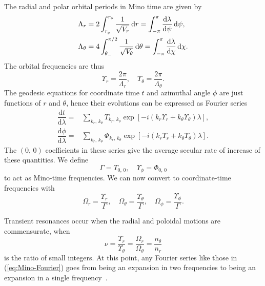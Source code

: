 \documentclass[aps,prd,amsfonts,amssymb,amsmath,nofootinbib,reprint,showpacs,superscriptaddress,twocolumn]{revtex4}
\newcommand{\eqnref}[1]{(\ref{eq:#1})}
\newcommand{\sub}[1]{\ensuremath{_\text{#1}}}
\newcommand{\dd}{\ensuremath{\mathrm{d}}}
\newcommand{\diff}[2]{\ensuremath{\dfrac{\dd {#1}}{\dd {#2}}}}
\newcommand{\intd}[4]{\ensuremath{\int_{#1}^{#2}{#3}\,\dd{#4}}}
\begin{document}
The radial and polar orbital periods in Mino time are given by
\begin{subequations}
\begin{align}
\Lambda_r = {} & 2\intd{r\sub{p}}{r\sub{a}}{\recip{\sqrt{V_r}}}{r} = \intd{-\pi}{\pi}{\diff{\lambda}{\psi}}{\psi}, \\
\Lambda_\theta = {} & 4\intd{\theta_-}{\pi/2}{\recip{\sqrt{V_\theta}}}{\theta} = \intd{-\pi}{\pi}{\diff{\lambda}{\chi}}{\chi}.
\end{align}
\end{subequations}
The orbital frequencies are thus
\begin{equation}
\Upsilon_r = \frac{2\pi}{\Lambda_r}, \quad \Upsilon_\theta = \frac{2\pi}{\Lambda_\theta}.
\end{equation}
The geodesic equations for coordinate time $t$ and azimuthal angle $\phi$ are just functions of $r$ and $\theta$, hence their evolutions can be expressed as Fourier series~\cite{Drasco2004}
\begin{subequations}
\begin{align}
\diff{t}{\lambda} = {} & \sum_{k_r,\,k_\theta}T_{k_r,\, k_\theta}\exp\left[-i\left(k_r\Upsilon_r + k_\theta\Upsilon_\theta\right)\lambda\right], \\
\diff{\phi}{\lambda} = {} & \sum_{k_r,\,k_\theta}\Phi_{k_r,\, k_\theta}\exp\left[-i\left(k_r\Upsilon_r + k_\theta\Upsilon_\theta\right)\lambda\right].
\label{eq:Mino-Fourier}
\end{align}
\end{subequations}
The $(0,\,0)$ coefficients in these series give the average secular rate of increase of these quantities. We define
\begin{equation}
\Gamma = T_{0,\,0}, \quad \Upsilon_\phi = \Phi_{0,\,0}
\end{equation}
to act as Mino-time frequencies. We can now convert to coordinate-time frequencies with
\begin{equation}
\Omega_r = \frac{\Upsilon_r}{\Gamma}, \quad \Omega_\theta = \frac{\Upsilon_\theta}{\Gamma}, \quad \Omega_\phi = \frac{\Upsilon_\phi}{\Gamma}.
\end{equation}

Transient resonances occur when the radial and poloidal motions are commensurate, when
\begin{equation}
\nu = \frac{\Upsilon_r}{\Upsilon_\theta} = \frac{\Omega_r}{\Omega_\theta} = \frac{n_\theta}{n_r}
\end{equation}
is the ratio of small integers. At this point, any Fourier series like those in \eqnref{Mino-Fourier} goes from being an expansion in two frequencies to being an expansion in a single frequency~\cite{Bosley1992}.
\end{document}
